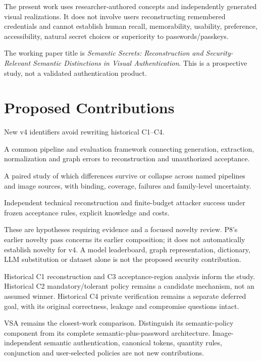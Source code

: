 \documentclass[11pt,a4paper]{article}
\begin{document}
The present work uses researcher-authored concepts and independently generated visual realizations. It does not involve users reconstructing remembered credentials and cannot establish human recall, memorability, usability, preference, accessibility, natural secret choices or superiority to passwords/passkeys.

The working paper title is \emph{Semantic Secrets: Reconstruction and Security-Relevant Semantic Distinctions in Visual Authentication}. This is a prospective study, not a validated authentication product.

\section{Proposed Contributions}
New v4 identifiers avoid rewriting historical C1--C4.
\begin{description}[style=nextline]
\item[V4-C1: Error-to-authentication methodology]
A common pipeline and evaluation framework connecting generation, extraction, normalization and graph errors to reconstruction and unauthorized acceptance.
\item[V4-C2: Semantic distinction evidence]
A paired study of which differences survive or collapse across named pipelines and image sources, with binding, coverage, failures and family-level uncertainty.
\item[V4-C3: Reconstruction and attacker outcomes]
Independent technical reconstruction and finite-budget attacker success under frozen acceptance rules, explicit knowledge and costs.
\end{description}
These are hypotheses requiring evidence and a focused novelty review. P8's earlier novelty pass concerns its earlier composition; it does not automatically establish novelty for v4. A model leaderboard, graph representation, dictionary, LLM substitution or dataset alone is not the proposed security contribution.

Historical C1 reconstruction and C3 acceptance-region analysis inform the study. Historical C2 mandatory/tolerant policy remains a candidate mechanism, not an assumed winner. Historical C4 private verification remains a separate deferred goal, with its original correctness, leakage and compromise questions intact.

VSA remains the closest-work comparison. Distinguish its semantic-policy component from its complete semantic-plus-password architecture. Image-independent semantic authentication, canonical tokens, quantity rules, conjunction and user-selected policies are not new contributions.
\end{document}
